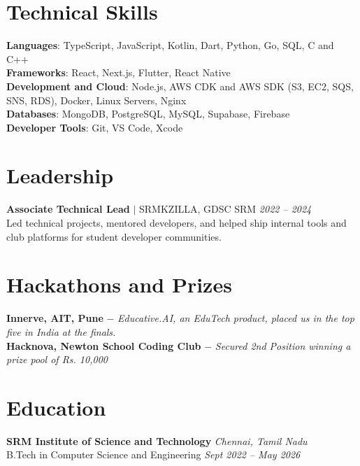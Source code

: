 \documentclass[a4paper,11pt]{article}
\begin{document}
\section{Technical Skills}
 \begin{itemize}[leftmargin=0.15in, label={}]
    \small{\item{
     \textbf{Languages}{: TypeScript, JavaScript, Kotlin, Dart, Python, Go, SQL, C and C++} \\
     \textbf{Frameworks}{: React, Next.js, Flutter, React Native } \\
     \textbf{Development and Cloud}{: Node.js, AWS CDK and AWS SDK (S3, EC2, SQS, SNS, RDS), Docker, Linux Servers, Nginx } \\
     \textbf{Databases}{: MongoDB, PostgreSQL, MySQL, Supabase, Firebase } \\
     \textbf{Developer Tools}{: Git, VS Code, Xcode } }}
 \end{itemize}

\section{Leadership}
\begin{itemize}[leftmargin=0.15in, label={}]
    \small{\item{
     {\textbf{Associate Technical Lead} $|$ {SRMKZILLA, GDSC SRM} \hfill \emph{2022 -- 2024}}\\
     {Led technical projects, mentored developers, and helped ship internal tools and club platforms for student developer communities.}
    }}
\end{itemize}

\section{Hackathons and Prizes}
 \begin{itemize}[leftmargin=0.15in, label={}]
    \small{\item{
     {\textbf{Innerve, AIT, Pune} $-$ \emph{Educative.AI, an EduTech product, placed us in the top five in India at the finals.}}
     \\
     {\textbf{Hacknova, Newton School Coding Club} $-$ \emph{Secured 2nd Position winning a prize pool of Rs. 10,000}}
    }}
 \end{itemize}

\section{Education}
\begin{itemize}[leftmargin=0.15in, label={}]
    \small{
        \item{
            {\textbf{SRM Institute of Science and Technology} \hfill \emph{Chennai, Tamil Nadu}}\\
            {B.Tech in Computer Science and Engineering \hfill \emph{Sept 2022 -- May 2026}}
        }
    }
\end{itemize}
\end{document}
